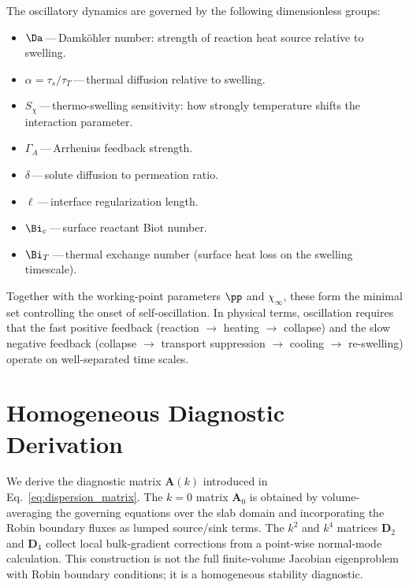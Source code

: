 The oscillatory dynamics are governed by the following dimensionless groups:
\begin{itemize}
  \item $\Da$\,---\,Damk\"ohler number: strength of reaction heat source relative to swelling.
  \item $\alpha = \tau_s/\tau_T$\,---\,thermal diffusion relative to swelling.
  \item $S_\chi$\,---\,thermo-swelling sensitivity: how strongly temperature shifts the interaction parameter.
  \item $\Gamma_A$\,---\,Arrhenius feedback strength.
  \item $\delta$\,---\,solute diffusion to permeation ratio.
  \item $\ell$\,---\,interface regularization length.
  \item $\Bi_c$\,---\,surface reactant Biot number.
  \item $\Bi_T$\,---\,thermal exchange number (surface heat loss on the swelling timescale).
\end{itemize}
Together with the working-point parameters $\pp$ and $\chi_\infty$, these form the minimal set controlling the onset of self-oscillation. In physical terms, oscillation requires that the fast positive feedback (reaction $\to$ heating $\to$ collapse) and the slow negative feedback (collapse $\to$ transport suppression $\to$ cooling $\to$ re-swelling) operate on well-separated time scales.

\section{Homogeneous Diagnostic Derivation}
\label{app:lsa}

We derive the diagnostic matrix $\mathbf A(k)$ introduced in
Eq.~\eqref{eq:dispersion_matrix}.  The $k=0$ matrix $\mathbf A_0$
is obtained by volume-averaging the governing equations over the slab
domain and incorporating the Robin boundary fluxes as lumped
source/sink terms.  The $k^2$ and $k^4$ matrices $\mathbf D_2$ and
$\mathbf D_4$ collect local bulk-gradient corrections from a
point-wise normal-mode calculation.  This construction is not the
full finite-volume Jacobian eigenproblem with Robin boundary
conditions; it is a homogeneous stability diagnostic.

